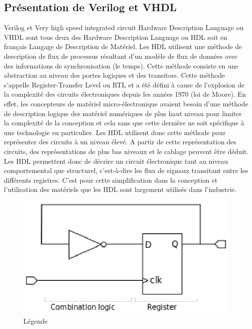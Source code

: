 \vspace{15px}
\subsection{Présentation de Verilog et VHDL}
\vspace{15px}
Verilog et Very high speed integrated circuit Hardware Description Language ou VHDL sont tous deux des Hardware Description Language ou HDL soit en français Langage de Description de Matériel. Les HDL utilisent une méthode de description de flux de processus résultant d'un modèle de flux de données avec des informations de synchronisation (le temps). Cette méthode consiste en une abstraction au niveau des portes logiques et des transitors. Cette méthode s'appelle Register-Transfer Level ou RTL et a été défini à cause de l'explosion de la complexité des circuits électroniques depuis les années 1970 (loi de Moore). En effet, les concepteurs de matériel micro-électronique avaient besoin d'une méthode de description logique des matériel numériques de plus haut niveau pour limiter la complexité de la conception et cela sans que cette dernière ne soit spécifique à une technologie en particulier. Les HDL utilisent donc cette méthode pour représenter des circuits à un niveau élevé. A partir de cette représentation des circuits, des représentations de plus bas niveaux et le cablage peuvent être déduit. Les HDL permettent donc de décrire un circuit électronique tant au niveau comportemental que structurel, c'est-à-dire les flux de signaux transitant entre les différents registres. C'est pour cette simplification dans la conception et l'utilisation des matériels que les HDL sont largement utilisés dans l'industrie.
\newpage

\begin{figure}
\begin{center}
\includegraphics[scale=0.8]{rtl_example.eps}
\end{center}
\caption{Légende}
\label{Référence}
\end{figure}


